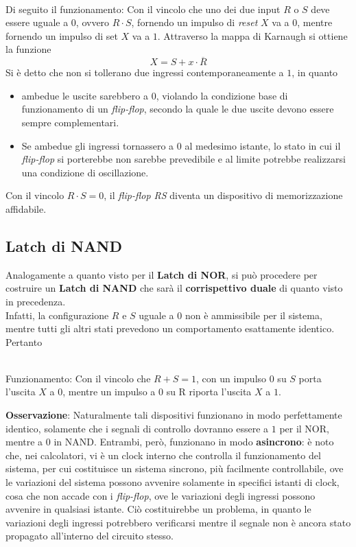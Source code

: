 \documentclass[a4paper]{extarticle}
\begin{document}
\\
Di seguito il funzionamento: Con il vincolo che uno dei due input \(R\) o \(S\) deve essere uguale a \(0\), ovvero \(R \cdot S\), fornendo un impulso di \textit{reset} \(X\) va a \(0\), mentre fornendo un impulso di set \(X\) va a \(1\). Attraverso la mappa di Karnaugh si ottiene la funzione
\[X = S + x \cdot \overline{R}\]
Si è detto che non si tollerano due ingressi contemporaneamente a \(1\), in quanto
\begin{itemize}
    \item ambedue le uscite sarebbero a \(0\), violando la condizione base di funzionamento di un \textit{flip-flop}, secondo la quale le due uscite devono essere sempre complementari.

    \item Se ambedue gli ingressi tornassero a \(0\) al medesimo istante, lo stato in cui il \textit{flip-flop} si porterebbe non sarebbe prevedibile e al limite potrebbe realizzarsi una condizione di oscillazione.
\end{itemize}
Con il vincolo \(R \cdot S = 0\), il \textit{flip-flop RS} diventa un dispositivo di memorizzazione affidabile.

\subsection{Latch di NAND}
Analogamente a quanto visto per il \textbf{Latch di NOR}, si può procedere per costruire un \textbf{Latch di NAND} che sarà il \textbf{corrispettivo duale} di quanto visto in precedenza.\\
Infatti, la configurazione \(R\) e \(S\) uguale a \(0\) non è ammissibile per il sistema, mentre tutti gli altri stati prevedono un comportamento esattamente identico. Pertanto

\\Funzionamento: Con il vincolo che \(R + S = 1\), con un impulso \(0\) su \(S\) porta l'uscita \(X\) a \(0\), mentre un impulso a \(0\) su R riporta l'uscita \(X\) a \(1\).

\vspace{1em}
\noindent
\textbf{Osservazione}: Naturalmente tali dispositivi funzionano in modo perfettamente identico, solamente che i segnali di controllo dovranno essere a \(1\) per il NOR, mentre a \(0\) in NAND. Entrambi, però, funzionano in modo \textbf{asincrono}: è noto che, nei calcolatori, vi è un clock interno che controlla il funzionamento del sistema, per cui costituisce un sistema sincrono, più facilmente controllabile, ove le variazioni del sistema possono avvenire solamente in specifici istanti di clock, cosa che non accade con i \textit{flip-flop}, ove le variazioni degli ingressi possono avvenire in qualsiasi istante. Ciò costituirebbe un problema, in quanto le variazioni degli ingressi potrebbero verificarsi mentre il segnale non è ancora stato propagato all'interno del circuito stesso.
\end{document}
